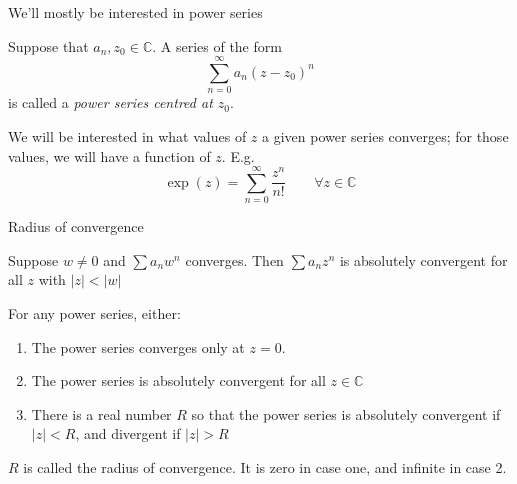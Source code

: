 \documentclass{beamer}
\newcommand{\C}{\mathbb{C}}
\begin{document}
\begin{frame}{We'll mostly be interested in power series}
\begin{definition} Suppose that $a_n, z_0\in \C$. A series of the form
$$\sum_{n=0}^\infty a_n (z-z_0)^n$$
is called a \emph{power series centred at $z_0$}.
\end{definition}
We will be interested in what values of $z$ a given power series converges; for those values, we will have a function of $z$.  E.g.
$$\exp(z)=\sum_{n=0}^\infty \frac{z^n}{n!}\quad\quad\forall z\in\C$$
\end{frame}

\begin{frame}{Radius of convergence}
\begin{theorem} Suppose $w\neq 0$ and $\sum a_n w^n$ converges.  Then $\sum a_n z^n$ is absolutely convergent for all $z$ with $|z|<|w|$
\end{theorem}
\begin{theorem}[Abel]
For any power series, either:
\begin{enumerate}
\item The power series converges only at $z=0$.
\item The power series is absolutely convergent for all $z\in\C$
\item There is a real number $R$ so that the power series is absolutely convergent if $|z|<R$, and divergent if $|z|>R$
\end{enumerate}
\end{theorem}
$R$ is called the radius of convergence. It is zero in case one, and infinite in case 2.

\end{frame}
\end{document}
